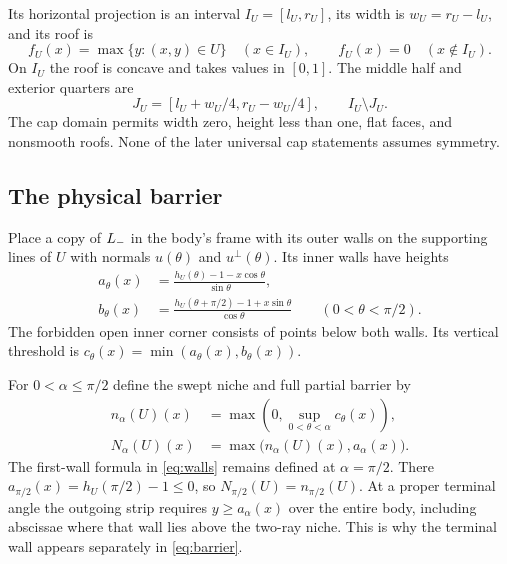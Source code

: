 Its horizontal projection is an interval $I_U=[l_U,r_U]$, its width
is $w_U=r_U-l_U$, and its roof is
\[
 f_U(x)=\max\{y:(x,y)\in U\}\quad(x\in I_U),
 \qquad f_U(x)=0\quad(x\notin I_U).
\]
On $I_U$ the roof is concave and takes values in $[0,1]$. The middle
half and exterior quarters are
\[
 J_U=[l_U+w_U/4,r_U-w_U/4],\qquad I_U\setminus J_U.
\]
The cap domain permits width zero, height less than one, flat faces,
and nonsmooth roofs. None of the later universal cap statements
assumes symmetry.

\subsection{The physical barrier}
Place a copy of $L_-$ in the body's frame with its outer walls on
the supporting lines of $U$ with normals $u(\theta)$ and
$u^\perp(\theta)$. Its inner walls have heights
\begin{equation}\label{eq:walls}
 \begin{aligned}
 a_\theta(x)&=\frac{h_U(\theta)-1-x\cos\theta}{\sin\theta},\\
 b_\theta(x)&=\frac{h_U(\theta+\pi/2)-1+x\sin\theta}{\cos\theta}
 \qquad(0<\theta<\pi/2).
 \end{aligned}
\end{equation}
The forbidden open inner corner consists of points below both walls.
Its vertical threshold is $c_\theta(x)=\min(a_\theta(x),b_\theta(x))$.

For $0<\alpha\le\pi/2$ define the swept niche and full partial barrier
by
\begin{align}
 n_\alpha(U)(x)&=\max\left(0,\sup_{0<\theta<\alpha}c_\theta(x)\right),
       \label{eq:niche}\\
 N_\alpha(U)(x)&=\max\bigl(n_\alpha(U)(x),a_\alpha(x)\bigr).
       \label{eq:barrier}
\end{align}
The first-wall formula in \cref{eq:walls} remains defined at
$\alpha=\pi/2$. There
$a_{\pi/2}(x)=h_U(\pi/2)-1\le0$, so
$N_{\pi/2}(U)=n_{\pi/2}(U)$. At a proper terminal angle the outgoing
strip requires $y\ge a_\alpha(x)$ over the entire body, including
abscissae where that wall lies above the two-ray niche. This is why
the terminal wall appears separately in \cref{eq:barrier}.

